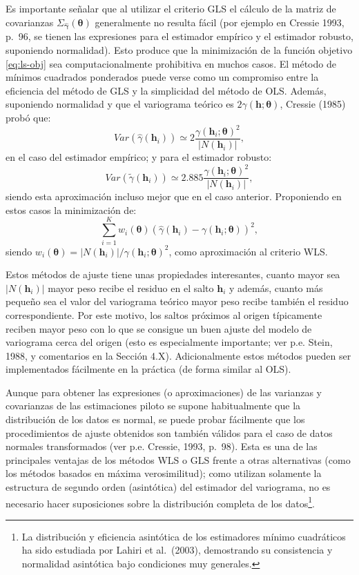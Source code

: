 \documentclass[
  spanish,
]{book}
\theoremstyle{break}
\theoremstyle{definition}
\theoremstyle{definition}
\theoremstyle{definition}
\theoremstyle{definition}
\theoremstyle{remark}
\begin{document}
Es importante señalar que al utilizar el criterio GLS el cálculo de la matriz de covarianzas \(\Sigma_{\hat{\boldsymbol{\gamma}}} (\boldsymbol{\theta})\) generalmente no resulta fácil (por ejemplo en Cressie 1993, p.~96, se tienen las expresiones para el estimador empírico y el estimador robusto, suponiendo normalidad).
Esto produce que la minimización de la función objetivo \eqref{eq:ls-obj} sea computacionalmente prohibitiva en muchos casos.
El método de mínimos cuadrados ponderados puede verse como un compromiso entre la eficiencia del método de GLS y la simplicidad del método de OLS.
Además, suponiendo normalidad y que el variograma teórico es \(2\gamma(\mathbf{h};\boldsymbol{\theta})\), Cressie (1985) probó que:
\[Var(\hat{\gamma}(\mathbf{h}_{i}))\simeq 2\dfrac{\gamma(\mathbf{h}_{i}
;\boldsymbol{\theta})^2 }{\left| N(\mathbf{h}_{i})\right| },\]
en el caso del estimador empírico; y para el estimador robusto:
\[Var(\tilde{\gamma}(\mathbf{h}_{i}))\simeq 2.885\dfrac{\gamma
(\mathbf{h}_{i} ;\boldsymbol{\theta})^2 }{\left| N(\mathbf{h}_{i})\right| },\]
siendo esta aproximación incluso mejor que en el caso anterior.
Proponiendo en estos casos la minimización de:
\[\sum\limits_{i=1}^{K} w_{i}(\boldsymbol{\theta}) \left( \hat{\gamma}(\mathbf{h}_{i}) - \gamma(\mathbf{h}_{i};\boldsymbol{\theta}) \right)^2,\]
siendo \(w_{i}(\boldsymbol{\theta}) = \left| N(\mathbf{h}_{i})\right| /\gamma(\mathbf{h}_{i} ;\boldsymbol{\theta})^2\), como aproximación al criterio WLS.

Estos métodos de ajuste tiene unas propiedades interesantes, cuanto mayor sea \(\left| N(\mathbf{h}_{i})\right|\) mayor peso recibe el residuo en el salto \(\mathbf{h}_{i}\) y además, cuanto más pequeño sea el valor del variograma teórico mayor peso recibe también el residuo correspondiente.
Por este motivo, los saltos próximos al origen típicamente reciben mayor peso con lo que se consigue un buen ajuste del modelo de variograma cerca del origen (esto es especialmente importante; ver p.e. Stein, 1988, y comentarios en la Sección 4.X).
Adicionalmente estos métodos pueden ser implementados fácilmente en la práctica (de forma similar al OLS).

Aunque para obtener las expresiones (o aproximaciones) de las varianzas y covarianzas de las estimaciones piloto se supone habitualmente que la distribución de los datos es normal, se puede probar fácilmente que los procedimientos de ajuste obtenidos son también válidos para el caso de datos normales transformados (ver p.e. Cressie, 1993, p.~98).
Esta es una de las principales ventajas de los métodos WLS o GLS frente a otras alternativas (como los métodos basados en máxima verosimilitud); como utilizan solamente la estructura de segundo orden (asintótica) del estimador del variograma, no es necesario hacer suposiciones sobre la distribución completa de los datos\footnote{La distribución y eficiencia asintótica de los estimadores mínimo cuadráticos ha sido estudiada por Lahiri et al.~(2003), demostrando su consistencia y normalidad asintótica bajo condiciones muy generales.}.
\end{document}
